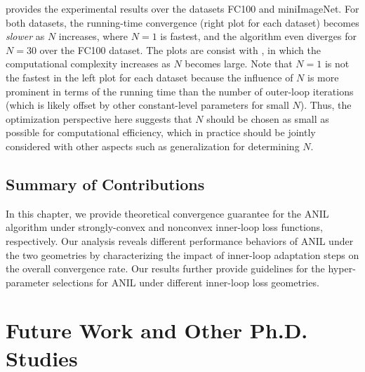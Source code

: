 \documentclass{osudissert96}
\begin{document}
 provides the experimental results over the datasets FC100 and miniImageNet. 
For both datasets, the running-time convergence (right plot for each dataset) 
becomes {\em slower} as $N$ increases, where $N=1$ is fastest, and the algorithm even diverges for $N=30$ over the FC100 dataset. The plots are consist with , in which the computational complexity increases as $N$ becomes large. Note that $N=1$ is not the fastest in the left plot for each dataset because the influence of $N$ is more prominent in terms of the running time than the number of outer-loop iterations (which is likely offset by other constant-level parameters for small $N$).
Thus, the optimization perspective here suggests that $N$ should be chosen as small as possible for computational efficiency, which in practice should be jointly considered with other aspects such as generalization for determining $N$. 



\section{Summary of Contributions}
In this chapter, we provide theoretical convergence guarantee for the ANIL algorithm under strongly-convex and nonconvex inner-loop loss functions, respectively. Our analysis reveals different performance behaviors of ANIL under the two geometries by characterizing the impact of inner-loop adaptation steps on the overall convergence rate. Our results further provide guidelines for the hyper-parameter selections for ANIL under different inner-loop loss geometries. 

\chapter{Future Work and Other Ph.D. Studies}\label{end.ch}
\end{document}
